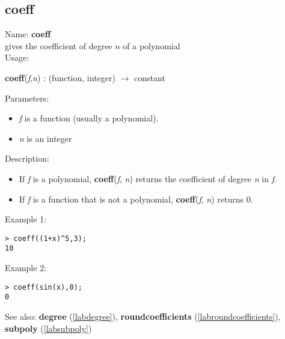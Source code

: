 \subsection{coeff}
\label{labcoeff}
\noindent Name: \textbf{coeff}\\
gives the coefficient of degree $n$ of a polynomial\\
\noindent Usage: 
\begin{center}
\textbf{coeff}(\emph{f},\emph{n}) : (\textsf{function}, \textsf{integer}) $\rightarrow$ \textsf{constant}\\
\end{center}
Parameters: 
\begin{itemize}
\item \emph{f} is a function (usually a polynomial).
\item \emph{n} is an integer
\end{itemize}
\noindent Description: \begin{itemize}

\item If \emph{f} is a polynomial, \textbf{coeff}(\emph{f}, \emph{n}) returns the coefficient of
   degree \emph{n} in \emph{f}.

\item If \emph{f} is a function that is not a polynomial, \textbf{coeff}(\emph{f}, \emph{n}) returns 0.
\end{itemize}
\noindent Example 1: 
\begin{center}\begin{minipage}{15cm}\begin{Verbatim}[frame=single]
> coeff((1+x)^5,3);
10
\end{Verbatim}
\end{minipage}\end{center}
\noindent Example 2: 
\begin{center}\begin{minipage}{15cm}\begin{Verbatim}[frame=single]
> coeff(sin(x),0);
0
\end{Verbatim}
\end{minipage}\end{center}
See also: \textbf{degree} (\ref{labdegree}), \textbf{roundcoefficients} (\ref{labroundcoefficients}), \textbf{subpoly} (\ref{labsubpoly})

